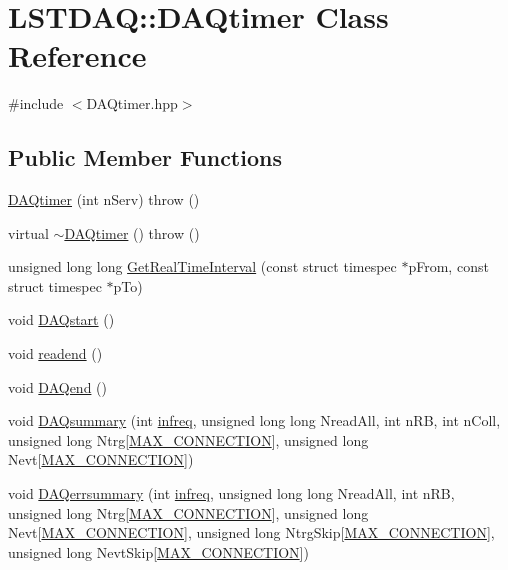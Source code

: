 \hypertarget{classLSTDAQ_1_1DAQtimer}{}\section{L\+S\+T\+D\+AQ\+:\+:D\+A\+Qtimer Class Reference}
\label{classLSTDAQ_1_1DAQtimer}


{\ttfamily \#include $<$D\+A\+Qtimer.\+hpp$>$}

\subsection*{Public Member Functions}
\begin{DoxyCompactItemize}
\item 
\hyperlink{classLSTDAQ_1_1DAQtimer_a6a1ab88f23496541c108388a1b268a95}{D\+A\+Qtimer} (int n\+Serv)  throw ()
\item 
virtual \hyperlink{classLSTDAQ_1_1DAQtimer_aa65cf5fdfcb8aa192f81fbd6f09862ab}{$\sim$\+D\+A\+Qtimer} ()  throw ()
\item 
unsigned long long \hyperlink{classLSTDAQ_1_1DAQtimer_a05c66a2321d3d021d61f97d06de9e5ce}{Get\+Real\+Time\+Interval} (const struct timespec $\ast$p\+From, const struct timespec $\ast$p\+To)
\item 
void \hyperlink{classLSTDAQ_1_1DAQtimer_a7cdbf21a47a53b91eca5ce168332b439}{D\+A\+Qstart} ()
\item 
void \hyperlink{classLSTDAQ_1_1DAQtimer_af9ec83544dde4d527c901e68e314d3b3}{readend} ()
\item 
void \hyperlink{classLSTDAQ_1_1DAQtimer_a8e0c31d4c5cc3b27e405f2cb9862b12b}{D\+A\+Qend} ()
\item 
void \hyperlink{classLSTDAQ_1_1DAQtimer_afbce0a37db4e92120b92332c506c366f}{D\+A\+Qsummary} (int \hyperlink{Master_8cpp_a44ff404ab6caa6e80830e799d22120a0}{infreq}, unsigned long long Nread\+All, int n\+RB, int n\+Coll, unsigned long Ntrg\mbox{[}\hyperlink{Config_8hpp_a1ad0110a77b8abbc3c30f7ec903dab1b}{M\+A\+X\+\_\+\+C\+O\+N\+N\+E\+C\+T\+I\+ON}\mbox{]}, unsigned long Nevt\mbox{[}\hyperlink{Config_8hpp_a1ad0110a77b8abbc3c30f7ec903dab1b}{M\+A\+X\+\_\+\+C\+O\+N\+N\+E\+C\+T\+I\+ON}\mbox{]})
\item 
void \hyperlink{classLSTDAQ_1_1DAQtimer_a192697db9ffcedb3172152207be8adc5}{D\+A\+Qerrsummary} (int \hyperlink{Master_8cpp_a44ff404ab6caa6e80830e799d22120a0}{infreq}, unsigned long long Nread\+All, int n\+RB, unsigned long Ntrg\mbox{[}\hyperlink{Config_8hpp_a1ad0110a77b8abbc3c30f7ec903dab1b}{M\+A\+X\+\_\+\+C\+O\+N\+N\+E\+C\+T\+I\+ON}\mbox{]}, unsigned long Nevt\mbox{[}\hyperlink{Config_8hpp_a1ad0110a77b8abbc3c30f7ec903dab1b}{M\+A\+X\+\_\+\+C\+O\+N\+N\+E\+C\+T\+I\+ON}\mbox{]}, unsigned long Ntrg\+Skip\mbox{[}\hyperlink{Config_8hpp_a1ad0110a77b8abbc3c30f7ec903dab1b}{M\+A\+X\+\_\+\+C\+O\+N\+N\+E\+C\+T\+I\+ON}\mbox{]}, unsigned long Nevt\+Skip\mbox{[}\hyperlink{Config_8hpp_a1ad0110a77b8abbc3c30f7ec903dab1b}{M\+A\+X\+\_\+\+C\+O\+N\+N\+E\+C\+T\+I\+ON}\mbox{]})

\end{DoxyCompactItemize}
